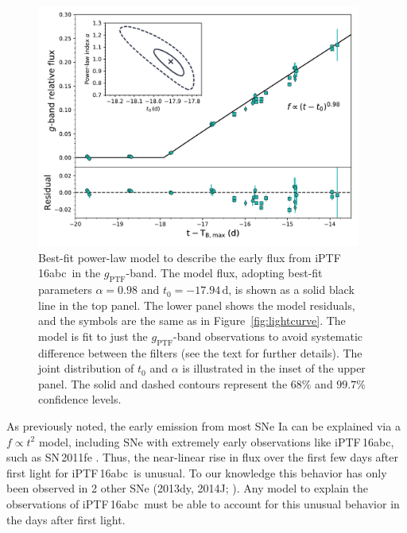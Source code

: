 \documentclass[twocolumn]{aastex61}
\newcommand{\abc}{iPTF\,16abc}
\begin{document}
\begin{figure}[!htb]
  \centering
  \includegraphics[width=0.95\textwidth]{early_lc.pdf}
  \caption{Best-fit power-law model to describe the early flux from 
  \abc\ in the $g_\mathrm{PTF}$-band. The model flux, adopting 
  best-fit parameters $\alpha=0.98$ and $t_0=-17.94\,\textrm{d}$, 
  is shown as a solid black line in the top panel. The lower panel 
  shows the model residuals, and the symbols are the same as in
  Figure~\ref{fig:lightcurve}. The model is fit to just the 
  $g_\mathrm{PTF}$-band observations to avoid systematic difference 
  between the filters (see the text for further 
  details). The joint distribution of $t_0$ and $\alpha$ is 
  illustrated in the inset of the upper panel. The solid and 
  dashed contours represent the $68\%$ and $99.7\%$ confidence 
  levels.
  }
  \label{fig:early_lc_fit}
\end{figure}


As previously noted, the early emission from most SNe Ia can be explained via a $f \propto t^2$ model, including SNe with extremely early observations like \abc, such as SN\,2011fe \citep{2011Natur.480..344N}. Thus, the near-linear rise in flux over the first few days after first light for \abc\ is unusual. To our knowledge this behavior has only been observed in 2 other SNe (2013dy, 2014J; \citealt{2013ApJ...778L..15Z,2014ApJ...783L..24Z}). Any model to explain the observations of \abc\ must be able to account for this unusual behavior in the days after first light.  
\end{document}
